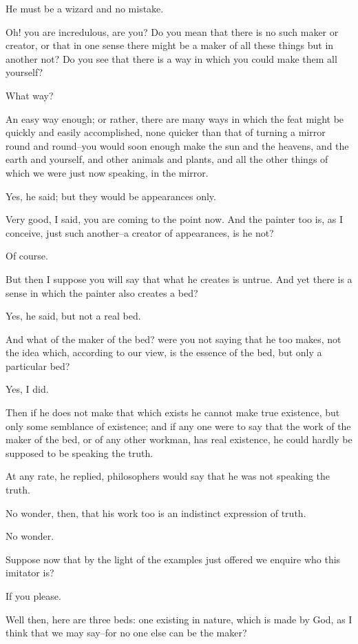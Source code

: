 He must be a wizard and no mistake.

Oh! you are incredulous, are you? Do you mean that there is no such
maker or creator, or that in one sense there might be a maker of all
these things but in another not? Do you see that there is a way in which
you could make them all yourself?

What way?

An easy way enough; or rather, there are many ways in which the feat
might be quickly and easily accomplished, none quicker than that of
turning a mirror round and round--you would soon enough make the sun and
the heavens, and the earth and yourself, and other animals and plants,
and all the other things of which we were just now speaking, in the
mirror.

Yes, he said; but they would be appearances only.

Very good, I said, you are coming to the point now. And the painter too
is, as I conceive, just such another--a creator of appearances, is he
not?

Of course.

But then I suppose you will say that what he creates is untrue. And yet
there is a sense in which the painter also creates a bed?

Yes, he said, but not a real bed.

And what of the maker of the bed? were you not saying that he too makes,
not the idea which, according to our view, is the essence of the bed,
but only a particular bed?

Yes, I did.

Then if he does not make that which exists he cannot make true
existence, but only some semblance of existence; and if any one were to
say that the work of the maker of the bed, or of any other workman, has
real existence, he could hardly be supposed to be speaking the truth.

At any rate, he replied, philosophers would say that he was not speaking
the truth.

No wonder, then, that his work too is an indistinct expression of truth.

No wonder.

Suppose now that by the light of the examples just offered we enquire
who this imitator is?

If you please.

Well then, here are three beds: one existing in nature, which is made by
God, as I think that we may say--for no one else can be the maker?

